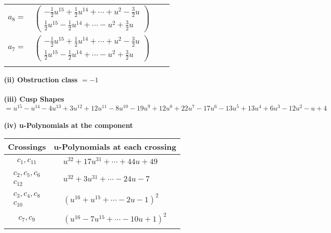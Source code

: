 \documentclass[1p]{elsarticle_modified}
\theoremstyle{definition}
\begin{document}
\begin{tabular}{m{7pt} m{180pt} m{7pt} m{180pt} }
\flushright $a_{8}=$&$\begin{pmatrix}-\frac{1}{2} u^{15}+\frac{1}{2} u^{14}+\cdots+u^2-\frac{3}{2} u\\\frac{1}{2} u^{15}-\frac{1}{2} u^{14}+\cdots- u^2+\frac{3}{2} u\end{pmatrix}$ \\
\flushright $a_{7}=$&$\begin{pmatrix}-\frac{1}{2} u^{15}+\frac{1}{2} u^{14}+\cdots+u^2-\frac{3}{2} u\\\frac{1}{2} u^{15}-\frac{1}{2} u^{14}+\cdots- u^2+\frac{3}{2} u\end{pmatrix}$\\&\end{tabular}
\flushleft \textbf{(ii) Obstruction class $= -1$}\\~\\
\flushleft \textbf{(iii) Cusp Shapes $= u^{15}- u^{14}-4 u^{13}+3 u^{12}+12 u^{11}-8 u^{10}-19 u^9+12 u^8+22 u^7-17 u^6-13 u^5+13 u^4+6 u^3-12 u^2- u+4$}\\~\\
\newpage\renewcommand{\arraystretch}{1}
\flushleft \textbf{(iv) u-Polynomials at the component}\newline \\
\begin{tabular}{m{50pt}|m{274pt}}
Crossings & \hspace{64pt}u-Polynomials at each crossing \\
\hline $$\begin{aligned}c_{1},c_{11}\end{aligned}$$&$\begin{aligned}
&u^{32}+17 u^{31}+\cdots+44 u+49
\end{aligned}$\\
\hline $$\begin{aligned}c_{2},c_{5},c_{6}\\c_{12}\end{aligned}$$&$\begin{aligned}
&u^{32}+3 u^{31}+\cdots-24 u-7
\end{aligned}$\\
\hline $$\begin{aligned}c_{3},c_{4},c_{8}\\c_{10}\end{aligned}$$&$\begin{aligned}
&(u^{16}+u^{15}+\cdots-2 u-1)^{2}
\end{aligned}$\\
\hline $$\begin{aligned}c_{7},c_{9}\end{aligned}$$&$\begin{aligned}
&(u^{16}-7 u^{15}+\cdots-10 u+1)^{2}
\end{aligned}$\\
\hline
\end{tabular}\\~\\
\end{document}
